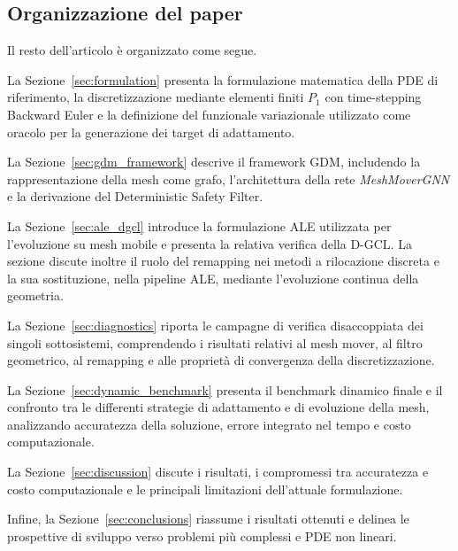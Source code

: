 \subsection{Organizzazione del paper}

Il resto dell'articolo è organizzato come segue.

La Sezione~\ref{sec:formulation} presenta la formulazione matematica della PDE di riferimento, la discretizzazione mediante elementi finiti $P_1$ con time-stepping Backward Euler e la definizione del funzionale variazionale utilizzato come oracolo per la generazione dei target di adattamento.

La Sezione~\ref{sec:gdm_framework} descrive il framework GDM, includendo la rappresentazione della mesh come grafo, l'architettura della rete \textit{MeshMoverGNN} e la derivazione del Deterministic Safety Filter.

La Sezione~\ref{sec:ale_dgcl} introduce la formulazione ALE utilizzata per l'evoluzione su mesh mobile e presenta la relativa verifica della D-GCL. La sezione discute inoltre il ruolo del remapping nei metodi a rilocazione discreta e la sua sostituzione, nella pipeline ALE, mediante l'evoluzione continua della geometria.

La Sezione~\ref{sec:diagnostics} riporta le campagne di verifica disaccoppiata dei singoli sottosistemi, comprendendo i risultati relativi al mesh mover, al filtro geometrico, al remapping e alle proprietà di convergenza della discretizzazione.

La Sezione~\ref{sec:dynamic_benchmark} presenta il benchmark dinamico finale e il confronto tra le differenti strategie di adattamento e di evoluzione della mesh, analizzando accuratezza della soluzione, errore integrato nel tempo e costo computazionale.

La Sezione~\ref{sec:discussion} discute i risultati, i compromessi tra accuratezza e costo computazionale e le principali limitazioni dell'attuale formulazione.

Infine, la Sezione~\ref{sec:conclusions} riassume i risultati ottenuti e delinea le prospettive di sviluppo verso problemi più complessi e PDE non lineari.
